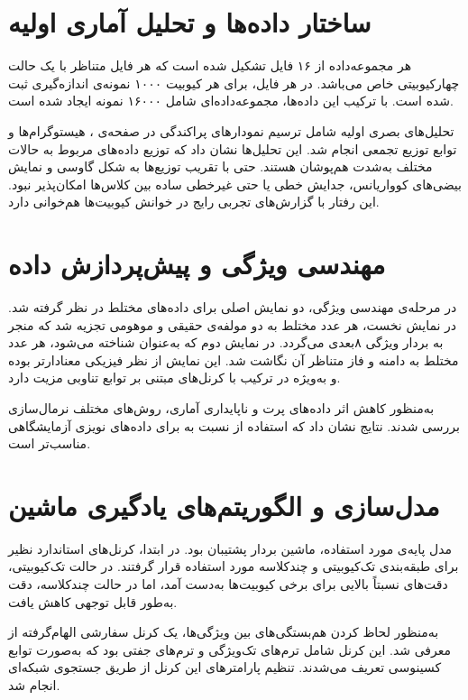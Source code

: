 \section{ساختار داده‌ها و تحلیل آماری اولیه}
هر مجموعه‌داده از ۱۶ فایل تشکیل شده است که هر فایل متناظر با یک حالت چهارکیوبیتی خاص می‌باشد. در هر فایل، برای هر کیوبیت ۱۰۰۰ نمونه‌ی اندازه‌گیری ثبت شده است. با ترکیب این داده‌ها، مجموعه‌داده‌ای شامل ۱۶۰۰۰ نمونه ایجاد شده است.

تحلیل‌های بصری اولیه شامل ترسیم نمودارهای پراکندگی در صفحه‌ی ، هیستوگرام‌ها و توابع توزیع تجمعی انجام شد. این تحلیل‌ها نشان داد که توزیع داده‌های مربوط به حالات مختلف به‌شدت هم‌پوشان هستند. حتی با تقریب توزیع‌ها به شکل گاوسی و نمایش بیضی‌های کوواریانس، جدایش خطی یا حتی غیرخطی ساده بین کلاس‌ها امکان‌پذیر نبود. این رفتار با گزارش‌های تجربی رایج در خوانش کیوبیت‌ها هم‌خوانی دارد.

\section{مهندسی ویژگی و پیش‌پردازش داده}
در مرحله‌ی مهندسی ویژگی، دو نمایش اصلی برای داده‌های مختلط در نظر گرفته شد. در نمایش نخست، هر عدد مختلط به دو مولفه‌ی حقیقی و موهومی تجزیه شد که منجر به بردار ویژگی ۸بعدی می‌گردد. در نمایش دوم که به‌عنوان  شناخته می‌شود، هر عدد مختلط به دامنه و فاز متناظر آن نگاشت شد. این نمایش از نظر فیزیکی معنادارتر بوده و به‌ویژه در ترکیب با کرنل‌های مبتنی بر توابع تناوبی مزیت دارد.

به‌منظور کاهش اثر داده‌های پرت و ناپایداری آماری، روش‌های مختلف نرمال‌سازی بررسی شدند. نتایج نشان داد که استفاده از  نسبت به  برای داده‌های نویزی آزمایشگاهی مناسب‌تر است.

\section{مدل‌سازی و الگوریتم‌های یادگیری ماشین}
مدل پایه‌ی مورد استفاده، ماشین بردار پشتیبان  بود. در ابتدا، کرنل‌های استاندارد نظیر  برای طبقه‌بندی تک‌کیوبیتی و چندکلاسه مورد استفاده قرار گرفتند. در حالت تک‌کیوبیتی، دقت‌های نسبتاً بالایی برای برخی کیوبیت‌ها به‌دست آمد، اما در حالت چندکلاسه، دقت به‌طور قابل توجهی کاهش یافت.

به‌منظور لحاظ کردن هم‌بستگی‌های بین ویژگی‌ها، یک کرنل سفارشی الهام‌گرفته از  معرفی شد. این کرنل شامل ترم‌های تک‌ویژگی و ترم‌های جفتی بود که به‌صورت توابع کسینوسی تعریف می‌شدند. تنظیم پارامترهای این کرنل از طریق جستجوی شبکه‌ای انجام شد.

